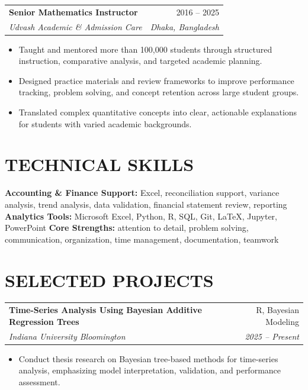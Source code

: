 \documentclass[10pt,letterpaper]{article}
\makeatletter
\newcommand{\resumeEntry}[4]{%
  \begin{tabularx}{\textwidth}{@{}Xr@{}}
    \textbf{#1} & #2 \\
    \textit{#3} & \textit{#4}
  \end{tabularx}%
}
\newenvironment{resumeItems}{%
  \begin{itemize}[
    label=\textbullet,
    leftmargin=14pt,
    labelsep=5pt,
    itemsep=0.5pt,
    topsep=1.0pt,
    parsep=0pt,
    partopsep=0pt
  ]
}{%
  \end{itemize}
}
\makeatother
\begin{document}
\vspace{1.3pt}

\resumeEntry
  {Senior Mathematics Instructor}
  {2016 -- 2025}
  {Udvash Academic \& Admission Care}
  {Dhaka, Bangladesh}

\begin{resumeItems}
  \item Taught and mentored more than 100,000 students through structured instruction, comparative analysis, and targeted academic planning.

  \item Designed practice materials and review frameworks to improve performance tracking, problem solving, and concept retention across large student groups.

  \item Translated complex quantitative concepts into clear, actionable explanations for students with varied academic backgrounds.
\end{resumeItems}

\section*{TECHNICAL SKILLS}

\textbf{Accounting \& Finance Support:} Excel, reconciliation support, variance analysis, trend analysis, data validation, financial statement review, reporting \newline
\textbf{Analytics Tools:} Microsoft Excel, Python, R, SQL, Git, LaTeX, Jupyter, PowerPoint \newline
\textbf{Core Strengths:} attention to detail, problem solving, communication, organization, time management, documentation, teamwork

\section*{SELECTED PROJECTS}

\resumeEntry
  {Time-Series Analysis Using Bayesian Additive Regression Trees}
  {R, Bayesian Modeling}
  {Indiana University Bloomington}
  {2025 -- Present}

\begin{resumeItems}
  \item Conduct thesis research on Bayesian tree-based methods for time-series analysis, emphasizing model interpretation, validation, and performance assessment.
\end{resumeItems}
\end{document}
